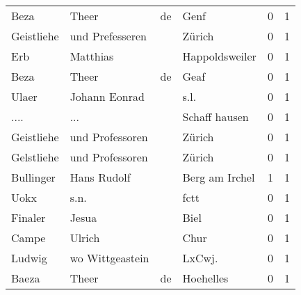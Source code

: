 \begin{tabular}{llllrr}
                     Beza &                              Theer &          de &                                        Genf &          0 &         1 \\
               Geistliehe &                    und Prefesseren &             &                                      Zürich &          0 &         1 \\
                      Erb &                           Matthias &             &                              Happoldsweiler &          0 &         1 \\
                     Beza &                              Theer &          de &                                        Geaf &          0 &         1 \\
                    Ulaer &                      Johann Eonrad &             &                                        s.l. &          0 &         1 \\
                     .... &                                ... &             &                               Schaff hausen &          0 &         1 \\
               Geistliehe &                    und Professoren &             &                                      Zürich &          0 &         1 \\
               Gelstliehe &                    und Professoren &             &                                      Zürich &          0 &         1 \\
                Bullinger &                        Hans Rudolf &             &                              Berg am Irchel &          1 &         1 \\
                     Uokx &                               s.n. &             &                                        fctt &          0 &         1 \\
                  Finaler &                              Jesua &             &                                        Biel &          0 &         1 \\
                    Campe &                             Ulrich &             &                                        Chur &          0 &         1 \\
                   Ludwig &                    wo Wittgeastein &             &                                     LxCwj.  &          0 &         1 \\
                    Baeza &                              Theer &          de &                                   Hoehelles &          0 &         1 \\

\end{tabular}
